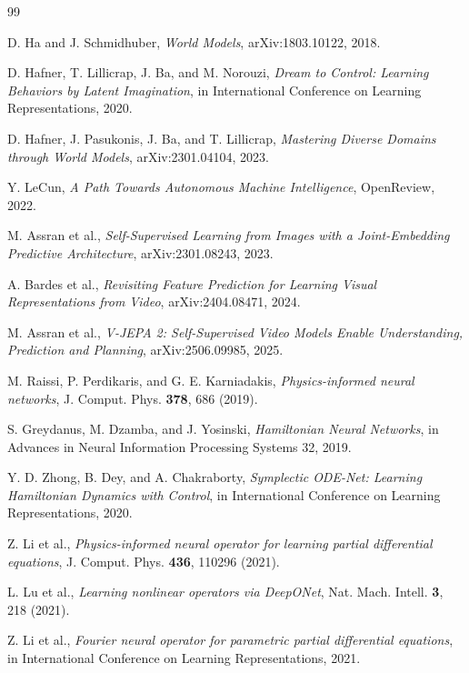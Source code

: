 \documentclass[reprint,aps,pre]{revtex4-2}
\begin{document}
\begin{thebibliography}{99}

D. Ha and J. Schmidhuber, \textit{World Models}, arXiv:1803.10122, 2018.

D. Hafner, T. Lillicrap, J. Ba, and M. Norouzi, \textit{Dream to Control: Learning Behaviors by Latent Imagination}, in International Conference on Learning Representations, 2020.

D. Hafner, J. Pasukonis, J. Ba, and T. Lillicrap, \textit{Mastering Diverse Domains through World Models}, arXiv:2301.04104, 2023.

Y. LeCun, \textit{A Path Towards Autonomous Machine Intelligence}, OpenReview, 2022.

M. Assran et al., \textit{Self-Supervised Learning from Images with a Joint-Embedding Predictive Architecture}, arXiv:2301.08243, 2023.

A. Bardes et al., \textit{Revisiting Feature Prediction for Learning Visual Representations from Video}, arXiv:2404.08471, 2024.

M. Assran et al., \textit{V-JEPA 2: Self-Supervised Video Models Enable Understanding, Prediction and Planning}, arXiv:2506.09985, 2025.

M. Raissi, P. Perdikaris, and G. E. Karniadakis, \textit{Physics-informed neural networks}, J. Comput. Phys. \textbf{378}, 686 (2019).

S. Greydanus, M. Dzamba, and J. Yosinski, \textit{Hamiltonian Neural Networks}, in Advances in Neural Information Processing Systems 32, 2019.

Y. D. Zhong, B. Dey, and A. Chakraborty, \textit{Symplectic ODE-Net: Learning Hamiltonian Dynamics with Control}, in International Conference on Learning Representations, 2020.

Z. Li et al., \textit{Physics-informed neural operator for learning partial differential equations}, J. Comput. Phys. \textbf{436}, 110296 (2021).

L. Lu et al., \textit{Learning nonlinear operators via DeepONet}, Nat. Mach. Intell. \textbf{3}, 218 (2021).

Z. Li et al., \textit{Fourier neural operator for parametric partial differential equations}, in International Conference on Learning Representations, 2021.


\end{thebibliography}
\end{document}

